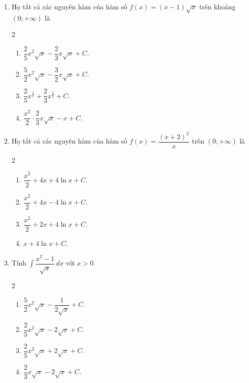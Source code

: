 \documentclass[12pt]{article}
\begin{document}
\begin{enumerate}[label=\textbf{Câu \arabic*.}]
		\item Họ tất cả các nguyên hàm của hàm số $f(x) = (x - 1)\sqrt{x}$ trên khoảng $(0; +\infty)$ là
		\begin{multicols}{2}
			\begin{enumerate}[label=\textbf{\Alph*.}]
				\item $\dfrac{2}{5}x^2\sqrt{x} - \dfrac{2}{3}x\sqrt{x} + C$.
				\item $\dfrac{5}{2}x^2\sqrt{x} - \dfrac{3}{2}x\sqrt{x} + C$.
				\item $\dfrac{2}{5}x^{\frac{5}{2}} + \dfrac{2}{3}x^{\frac{3}{2}} + C$.
				\item $\dfrac{x^2}{2} \cdot \dfrac{2}{3}x\sqrt{x} - x + C$.
			\end{enumerate}
		\end{multicols}
		
		\item Họ tất cả các nguyên hàm của hàm số $f(x) = \dfrac{(x+2)^2}{x}$ trên $(0; +\infty)$ là
		\begin{multicols}{2}
			\begin{enumerate}[label=\textbf{\Alph*.}]
				\item $\dfrac{x^2}{2} + 4x + 4\ln x + C$.
				\item $\dfrac{x^2}{2} + 4x - 4\ln x + C$.
				\item $\dfrac{x^2}{2} + 2x + 4\ln x + C$.
				\item $x + 4\ln x + C$.
			\end{enumerate}
		\end{multicols}
		
		\item Tính $\displaystyle \int \dfrac{x^2 - 1}{\sqrt{x}} \,dx$ với $x > 0$.
		\begin{multicols}{2}
			\begin{enumerate}[label=\textbf{\Alph*.}]
				
				\item $\dfrac{5}{2}x^2\sqrt{x} - \dfrac{1}{2\sqrt{x}} + C$.
				\item $\dfrac{2}{5}x^2\sqrt{x} - 2\sqrt{x} + C$.
				\item $\dfrac{2}{5}x^2\sqrt{x} + 2\sqrt{x} + C$.
				\item $\dfrac{2}{3}x\sqrt{x} - 2\sqrt{x} + C$.
			\end{enumerate}
		\end{multicols}
		

\end{enumerate}
\end{document}
